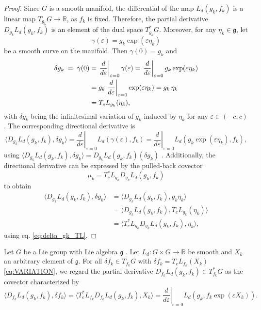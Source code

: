 \begin{proof}
Since $G$ is a smooth manifold, the differential of the map $L_d(g_k,f_k)$ is a linear map
$T_{g_k}G\to\mathbb R$, as $f_k$ is fixed. Therefore, the partial derivative
$D_{g_k}L_d(g_k,f_k)$ is an element of the dual space $T_{g_k}^*G$. Moreover, for any
$\eta_k \in \mathfrak g$, let
\[
\gamma(\varepsilon)=g_k\exp{(\varepsilon \eta_k)}
\]
be a smooth curve on the manifold. Then
$\gamma(0)=g_k$ and
\begin{align} \label{eq:delta_gk_TL}
\delta g_k \;=\; \dot\gamma(0)
&= \left.\frac{d}{d\varepsilon}\right|_{\varepsilon=0}\gamma(\varepsilon)
= \left.\frac{d}{d\varepsilon}\right|_{\varepsilon=0} g_k\exp(\varepsilon \eta_k) \notag\\
&= g_k\left.\frac{d}{d\varepsilon}\right|_{\varepsilon=0}\exp(\varepsilon \eta_k)
= g_k\,\eta_k \notag\\
&= T_eL_{g_k}(\eta_k),
\end{align}
with $\delta g_k$ being the infinitesimal variation of $g_k$ induced by $\eta_k$ for any
$\varepsilon \in (-c,c)$ \cite{Lee2008}. The corresponding directional derivative is
\[
\langle D_{g_k}L_d(g_k,f_k),\delta g_k\rangle
=
\left.\frac{d}{d\varepsilon}\right|_{\varepsilon=0}L_d(\gamma(\varepsilon),f_k)
=
\left.\frac{d}{d\varepsilon}\right|_{\varepsilon=0}L_d(g_k\exp{(\varepsilon \eta_k)},f_k),
\]
using $\langle D_{g_k}L_d(g_k,f_k),\delta g_k \rangle = D_{g_k}L_d(g_k,f_k)(\delta g_k)$ \cite{Lee2008}.
Additionally, the directional derivative can be expressed by the pulled-back covector
\[
\mu_k = T_e^* L_{g_k} D_{g_k}L_d(g_k,f_k)
\]
to obtain
\begin{align*}    
\langle D_{g_k}L_d(g_k,f_k),\delta g_k\rangle
&= \langle D_{g_k}L_d(g_k,f_k),g_k \eta_k \rangle \\
&= \langle D_{g_k}L_d(g_k,f_k), T_eL_{g_k}(\eta_k) \rangle \\
&= \langle T_e ^* L_{g_k} D_{g_k}L_d(g_k,f_k), \eta_k \rangle,
\end{align*}
using eq. \eqref{eq:delta_gk_TL}.
\end{proof}

\begin{proposition}
Let $G$ be a Lie group with Lie algebra $\mathfrak g$ \cite{Hall2000LieGroups}. Let 
$L_d:G\times G\to\mathbb R$ be smooth and $X_k$ an arbitrary element of $\mathfrak g$. For all $\delta f_k\in T_{f_k}G$ with $\delta f_k = T_eL_{f_k}(X_k)$ \eqref{eq:VARIATION},
we regard the partial derivative $D_{f_k}L_d(g_k,f_k)\in T_{f_k}^*G$ as the covector characterized by
\begin{equation} \label{eq:derivative_fk}
\langle D_{f_k}L_d(g_k,f_k),\delta f_k\rangle
=
\langle T_{e}^{*}L_{f_k} D_{f_k}L_d(g_k,f_k),X_k \rangle
=
\left.\frac{d}{d\varepsilon}\right|_{\varepsilon=0}L_d(g_k,f_k\exp{(\varepsilon X_k)}).
\end{equation}
\end{proposition}

